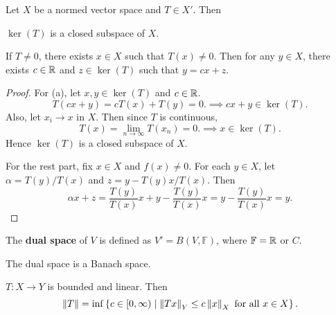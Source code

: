 \begin{proposition}\label{prop:kernel_closed}
    Let $X$ be a normed vector space and $T\in X'$. Then 
    \begin{thmenum}
        \item $\ker(T)$ is a closed subspace of $X$. 
        \item If $T\neq 0$, there exists $x\in X$ such that 
        $T(x)\neq 0$. Then for any $y\in X$, there exists 
        $c\in\mathbb{R}$ and $z\in\ker(T)$ such that $y = cx+z$.
    \end{thmenum}
\end{proposition}
\begin{proof}
    For (a), let $x,y\in\ker(T)$ and $c\in\mathbb{R}$. 
    \begin{equation*}
        T(cx+y) = cT(x)+T(y) = 0. \implies cx+y\in\ker(T).
    \end{equation*}
    Also, let $x_i\to x$ in $X$. Then since $T$ is continuous,  
    \begin{equation*}
        T(x) = \lim_{n\to\infty} T(x_n) = 0. \implies x\in\ker(T).
    \end{equation*}
    Hence $\ker(T)$ is a closed subspace of $X$. 

    For the rest part, fix $x\in X$ and $f(x)\neq 0$. For each 
    $y\in X$, let $\alpha = T(y)/T(x)$ and $z = y - T(y)x/T(x)$. 
    Then 
    \begin{equation*}
        \alpha x + z = \frac{T(y)}{T(x)}x + y - \frac{T(y)}{T(x)}x 
        = y - \frac{T(y)}{T(x)}x = y.
    \end{equation*}
\end{proof}

\begin{definition}
    The \textbf{dual space} of $V$ is defined as $V' = B(V,\mathbb{F})$, 
    where $\mathbb{F} = \mathbb{R}$ or $C$.
\end{definition}
\begin{remark}
    The dual space is a Banach space.
\end{remark}
\begin{remark}
    $T:X\to Y$ is bounded and linear. Then 
    \begin{equation*}
        \left\lVert {T} \right\rVert = \inf\left\{ c\in [0,\infty) \;\middle\vert\; \left\lVert {Tx} \right\rVert_Y \leq c\left\lVert {x} \right\rVert_X \text{ for all } x\in X \right\}.
    \end{equation*}
\end{remark}

